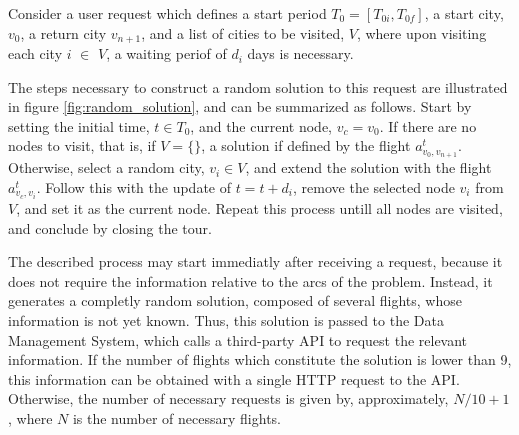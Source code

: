 Consider a user request which defines a start period $T_0=[T_{0i}, T_{0f}]$,
a start city, $v_0$, a return city $v_{n+1}$, and a list of cities to be visited,
$V$, where upon visiting each city $i$ $\in$ $V$, a waiting periof of $d_i$ days is necessary.

The steps necessary to construct a random solution to this request are illustrated in figure \ref{fig:random_solution},
and can be summarized as follows. Start by setting the initial time, $t \in T_0$, and the current node, $v_c = v_0$.
If there are no nodes to visit, that is, if $V = \{\}$, a solution if defined by the flight $a_{v_0, v_{n+1}}^{t}$.
Otherwise, select a random city, $v_i \in V$,
and extend the solution with the flight $a_{v_c, v_{i}}^{t}$. Follow this with the update of $t = t + d_i$,
remove the selected node $v_i$ from $V$, and set it as the current node.
Repeat this process untill all nodes are visited, and conclude by closing the tour.

The described process may start immediatly after receiving a request,
because it does not require the information relative to the arcs of the problem.
Instead, it generates a completly random solution, composed of several flights,
whose information is not yet known. 
Thus, this solution is passed to the Data Management System, which calls a third-party API 
to request the relevant information. If the number of flights which constitute the solution is lower than 9,
this information can be obtained with a single HTTP request to the API. Otherwise, the number of necessary requests 
is given by, approximately, $N/10 + 1$, where $N$ is the number of necessary flights.




